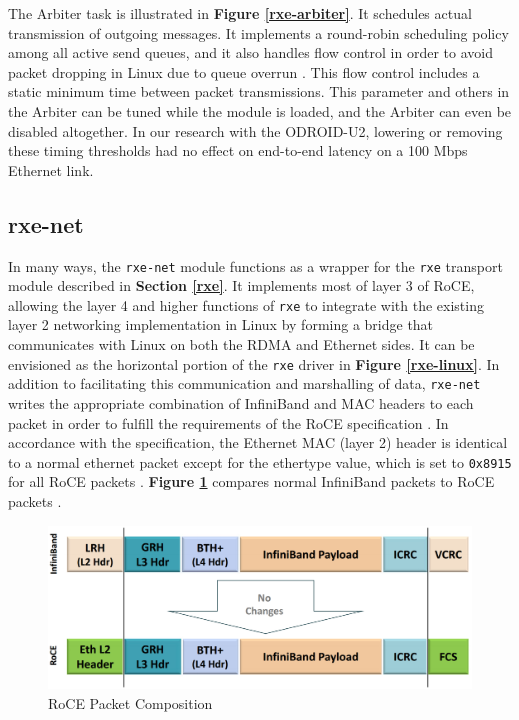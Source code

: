\documentclass[11pt]{book}
\begin{document}
The Arbiter task is illustrated in \textbf{Figure \ref{rxe-arbiter}}. It
schedules actual transmission of outgoing messages. It implements a round-robin
scheduling policy among all active send queues, and it also handles flow control
in order to avoid packet dropping in Linux due to queue overrun
\cite{pearson-10}. This flow control includes a static minimum time between
packet transmissions. This parameter and others in the Arbiter can be tuned
while the module is loaded, and the Arbiter can even be disabled
altogether. In our research with the ODROID-U2, lowering or removing these
timing thresholds had no effect on end-to-end latency on a 100 Mbps Ethernet
link.

\subsection{\textbf{rxe-net}}

In many ways, the \verb;rxe-net; module functions as a wrapper for the
\verb;rxe; transport module described in \textbf{Section \ref{rxe}}. It
implements most of layer 3 of RoCE, allowing the layer 4 and higher functions of
\verb;rxe; to integrate with the existing layer 2 networking implementation in
Linux by forming a bridge that communicates with Linux on both the RDMA and
Ethernet sides. It can be envisioned as the horizontal portion of the \verb;rxe;
driver in \textbf{Figure \ref{rxe-linux}}. In addition to facilitating this
communication and marshalling of data, \verb;rxe-net; writes the appropriate
combination of InfiniBand and MAC headers to each packet in order to fulfill the
requirements of the RoCE specification \cite{pearson-10}
\cite{InfiniBandTARoCE-10}. In accordance with the specification, the Ethernet
MAC (layer 2) header is identical to a normal ethernet packet except for the
ethertype value, which is set to \verb;0x8915; for all RoCE packets
\cite{InfiniBandTARoCE-10}. \textbf{Figure \ref{roce-packet}} compares normal
InfiniBand packets to RoCE packets \cite{ayoub-11} \cite{InfiniBandTABase-07}
\cite{InfiniBandTARoCE-10}.

\begin{figure}[h]
\includegraphics[width=\textwidth]{roce_packet}
\caption{RoCE Packet Composition \cite{ayoub-11}}
\label{roce-packet}
\end{figure}
\end{document}
